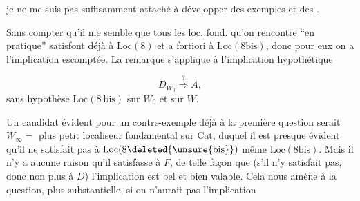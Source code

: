 
je ne me suis pas suffisamment attaché à développer des exemples et des .

Sans compter qu'il me semble que tous les loc. fond.  qu'on rencontre ``en pratique'' satisfont déjà à $\mathrm{Loc}(8)$ et a fortiori à $\mathrm{Loc}(8\mathrm{bis})$, donc pour eux on a  l'implication escomptée. La  remarque s'applique à l'implication hypothétique

\[
 D_{W_0}\overset{?}{\Longrightarrow}A,
\]
sans hypothèse $\mathrm{Loc}(8\ \mathrm{bis})$ sur $W_0$ et sur $W$.

 Un candidat évident pour un contre-exemple déjà à la première question serait $W_\infty={}$ plus petit localiseur fondamental sur $\mathrm{Cat}$, duquel il est presque évident qu'il ne satisfait pas à $\mathrm{Loc}(8\deleted{\unsure{\mathrm{bis}}})$  même $\mathrm{Loc}(8\mathrm{bis})$. Mais il n'y a aucune raison qu'il satisfasse  à $F$,  de telle façon que (s'il n'y satisfait pas\unsure{\deleted{)}|)}, donc non plus à $D$) l'implication  est bel et bien valable. Cela nous amène à la question, plus substantielle, si on n'aurait pas  l'implication

